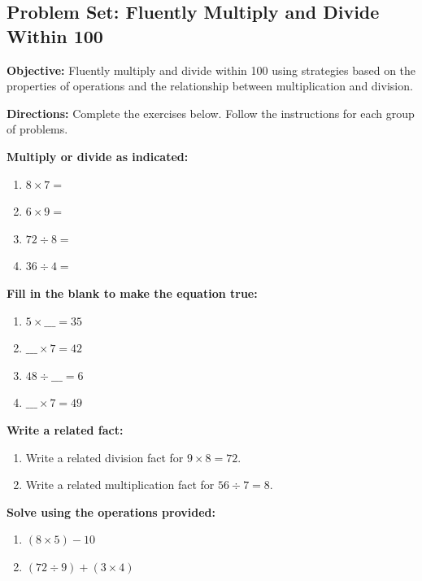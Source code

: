 \documentclass[12pt]{article}
\title{}
\date{}
\begin{document}
\subsection*{Problem Set: Fluently Multiply and Divide Within 100}
\onehalfspacing

\begin{tcolorbox}[colframe=black!40, colback=gray!5, 
coltitle=black, colbacktitle=black!20, fonttitle=\bfseries\Large, 
title=Learning Objective, halign title=center, left=5pt, right=5pt, top=5pt, bottom=15pt]
\textbf{Objective:} Fluently multiply and divide within 100 using strategies based on the properties of operations and the relationship between multiplication and division.
\end{tcolorbox}

\begin{tcolorbox}[colframe=black!60, colback=white, 
coltitle=black, colbacktitle=black!15, fonttitle=\bfseries\Large, 
title=Exercises, halign title=center, left=10pt, right=10pt, top=10pt, bottom=30pt]
\textbf{Directions:} Complete the exercises below. Follow the instructions for each group of problems.

\textbf{Multiply or divide as indicated:}
\begin{multicols}{2}
\begin{enumerate}[itemsep=.25em]
    \item  \(8 \times 7 = \)
    \item  \(6 \times 9 = \)
    \item \(72 \div 8 = \)
    \item  \(36 \div 4 = \)
\end{enumerate}
\end{multicols}

\textbf{Fill in the blank to make the equation true:}
\begin{enumerate}[resume, itemsep=1em]
    \item \(5 \times \_\_\_ = 35\)
    \item \( \_\_\_ \times 7 = 42\)
    \item \(48 \div \_\_\_ = 6\)
    \item \(\_\_\_ \times 7 = 49\)
\end{enumerate}

\textbf{Write a related fact:}
\begin{enumerate}[resume, itemsep=2em]
    \item Write a related division fact for \(9 \times 8 = 72\).
    \item Write a related multiplication fact for \(56 \div 7 = 8\).
    \vspace{2em}
\end{enumerate}

\textbf{Solve using the operations provided:}
\begin{enumerate}[resume, itemsep=1em]
    \item \((8 \times 5) - 10\)
    \item \((72 \div 9) + (3 \times 4)\)
\end{enumerate}
\end{tcolorbox}
\end{document}
